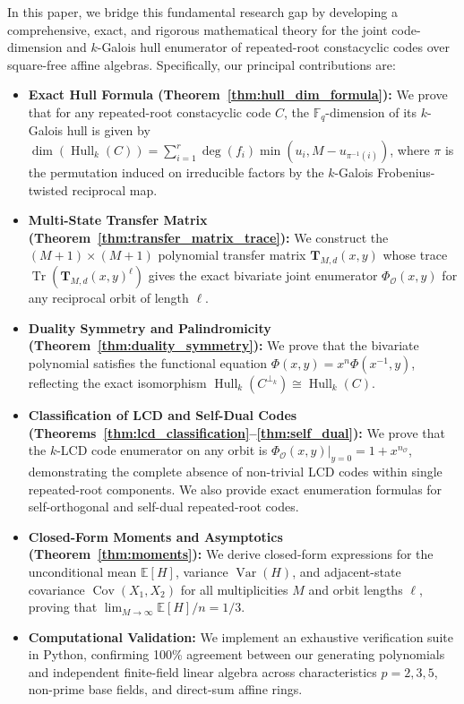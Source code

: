 \documentclass[preprint,12pt]{elsarticle}
\numberwithin{equation}{section}
\theoremstyle{plain}
\theoremstyle{definition}
\theoremstyle{remark}
\begin{document}
In this paper, we bridge this fundamental research gap by developing a comprehensive, exact, and rigorous mathematical theory for the joint code-dimension and $k$-Galois hull enumerator of repeated-root constacyclic codes over square-free affine algebras. Specifically, our principal contributions are:
\begin{itemize}
    \item \textbf{Exact Hull Formula (Theorem~\ref{thm:hull_dim_formula}):} We prove that for any repeated-root constacyclic code $C$, the $\mathbb{F}_q$-dimension of its $k$-Galois hull is given by $\dim(\operatorname{Hull}_k(C)) = \sum_{i=1}^r \deg(f_i) \min(u_i, M - u_{\pi^{-1}(i)})$, where $\pi$ is the permutation induced on irreducible factors by the $k$-Galois Frobenius-twisted reciprocal map.
    \item \textbf{Multi-State Transfer Matrix (Theorem~\ref{thm:transfer_matrix_trace}):} We construct the $(M+1) \times (M+1)$ polynomial transfer matrix $\mathbf{T}_{M, d}(x, y)$ whose trace $\operatorname{Tr}(\mathbf{T}_{M, d}(x, y)^\ell)$ gives the exact bivariate joint enumerator $\Phi_{\mathcal{O}}(x, y)$ for any reciprocal orbit of length $\ell$.
    \item \textbf{Duality Symmetry and Palindromicity (Theorem~\ref{thm:duality_symmetry}):} We prove that the bivariate polynomial satisfies the functional equation $\Phi(x, y) = x^n \Phi(x^{-1}, y)$, reflecting the exact isomorphism $\operatorname{Hull}_k(C^{\perp_k}) \cong \operatorname{Hull}_k(C)$.
    \item \textbf{Classification of LCD and Self-Dual Codes (Theorems~\ref{thm:lcd_classification}--\ref{thm:self_dual}):} We prove that the $k$-LCD code enumerator on any orbit is $\left.\Phi_{\mathcal{O}}(x, y)\right|_{y=0} = 1 + x^{n_{\mathcal{O}}}$, demonstrating the complete absence of non-trivial LCD codes within single repeated-root components. We also provide exact enumeration formulas for self-orthogonal and self-dual repeated-root codes.
    \item \textbf{Closed-Form Moments and Asymptotics (Theorem~\ref{thm:moments}):} We derive closed-form expressions for the unconditional mean $\mathbb{E}[H]$, variance $\operatorname{Var}(H)$, and adjacent-state covariance $\operatorname{Cov}(X_1, X_2)$ for all multiplicities $M$ and orbit lengths $\ell$, proving that $\lim_{M \to \infty} \mathbb{E}[H]/n = 1/3$.
    \item \textbf{Computational Validation:} We implement an exhaustive verification suite in Python, confirming 100\% agreement between our generating polynomials and independent finite-field linear algebra across characteristics $p=2, 3, 5$, non-prime base fields, and direct-sum affine rings.
\end{itemize}
\end{document}
